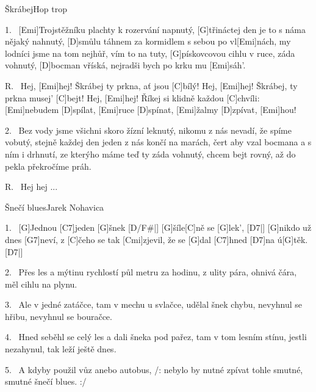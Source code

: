 \begin{song}{Škrábej}{Hop trop}

\begin{xverse}{1.~}
[Emi]Trojstěžníku plachty k rozervání napnutý,
[G]třináctej den je to s náma nějaký nahnutý,
[D]smůlu táhnem za kormidlem s sebou po vl[Emi]nách,
my lodníci jsme na tom nejhůř, vím to na tuty,
[G]pískovcovou cihlu v ruce, záda vohnutý,
[D]bocman vříská, nejradši bych po krku mu [Emi]sáh'.
\end{xverse}


\begin{xverse}{R.~}
Hej, [Emi]hej! Škrábej ty prkna, ať jsou [C]bílý!
Hej, [Emi]hej! Škrábej, ty prkna musej' [C]bejt!
Hej, [Emi]hej! Říkej si klidně každou [C]chvíli:
[Emi]nebudem [D]spílat, [Emi]ruce [D]spínat, [Emi]{}žalmy [D]zpívat, [Emi]hou!
\end{xverse}


\begin{xverse}{2.~}
Bez vody jsme všichni skoro žízní leknutý,
nikomu z nás nevadí, že spíme vobutý,
stejně každej den jeden z nás končí na marách,
čert aby vzal bocmana a s ním i drhnutí,
ze kterýho máme teď ty záda vohnutý,
chcem bejt rovný, až do pekla překročíme práh.
\end{xverse}


\begin{xverse}{R.~}
Hej hej ...
\end{xverse}

\end{song}

\begin{song}{Šnečí blues}{Jarek Nohavica}

\begin{xverse}{1.~}
[G]Jednou [C7]jeden [G]{šnek}  [D/F#|]{} [G]{ší}le[C]ně se [G]lek', [D7|]{}
[G]nikdo už dnes [G7]neví, z [C]{če}ho se tak [Cmi]zjevil,
že se [G]dal [C7]hned [D7]na  ú[G]těk. [D7|]{}
\end{xverse}


\begin{xverse}{2.~}
Přes les a mýtinu rychlostí půl metru za hodinu,
z ulity pára, ohnivá čára,
měl cihlu na plynu.
\end{xverse}


\begin{xverse}{3.~}
Ale v jedné zatáčce, tam v mechu u svlačce,
udělal šnek chybu, nevyhnul se hřibu,
nevyhnul se bouračce.
\end{xverse}


\begin{xverse}{4.~}
Hned seběhl se celý les a dali šneka pod pařez,
tam v tom lesním stínu, jestli nezahynul,
tak leží ještě dnes.
\end{xverse}


\begin{xverse}{5.~}
A kdyby použil vůz anebo autobus,
/: nebylo by nutné zpívat tohle smutné,
   smutné šnečí blues. :/
\end{xverse}

\end{song}
\chords{ \chordDFis }

